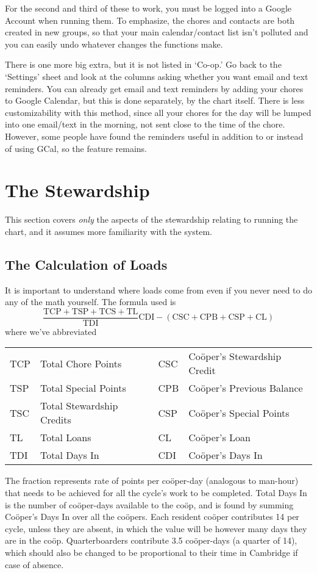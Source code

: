 \documentclass{article}
\begin{document}
For the second and third of these to work, you must be logged into a Google Account when running them.
To emphasize, the chores and contacts are both created in new groups, so that your main calendar/contact list isn't polluted and you can easily undo whatever changes the functions make.

There is one more big extra, but it is not listed in `Co-op.'
Go back to the `Settings' sheet and look at the columns asking whether you want email and text reminders.
You can already get email and text reminders by adding your chores to Google Calendar, but this is done separately, by the chart itself.
There is less customizability with this method, since all your chores for the day will be lumped into one email/text in the morning, not sent close to the time of the chore.
However, some people have found the reminders useful in addition to or instead of using GCal, so the feature remains.

\section{The Stewardship}
This section covers \emph{only} the aspects of the stewardship relating to running the chart, and it assumes more familiarity with the system.

\subsection{The Calculation of Loads}\label{subsec:calculationOfLoads}
It is important to understand where loads come from even if you never need to do any of the math yourself.
The formula used is
\begin{equation*}
\frac{\text{TCP} + \text{TSP} + \text{TCS} + \text{TL}}{\text{TDI}}\text{CDI} - (\text{CSC} + \text{CPB} + \text{CSP} + \text{CL})
\end{equation*}
where we've abbreviated
\begin{center}
\begin{tabular}{llll}
TCP  & Total Chore Points             &
CSC  & Co\"{o}per's Stewardship Credit\\
TSP  & Total Special Points           &
CPB  & Co\"{o}per's Previous Balance\\
TSC  & Total Stewardship Credits      &
CSP  & Co\"{o}per's Special Points\\
TL   & Total Loans                    &
CL   & Co\"{o}per's Loan\\
TDI  & Total Days In                  &
CDI  & Co\"{o}per's Days In
\end{tabular}
\end{center}
The fraction represents rate of points per co\"{o}per-day (analogous to man-hour) that needs to be achieved for all the cycle's work to be completed.
Total Days In is the number of co\"{o}per-days available to the co\"{o}p, and is found by summing Co\"{o}per's Days In over all the co\"{o}pers.
Each resident co\"{o}per contributes 14 per cycle, unless they are absent, in which the value will be however many days they are in the co\"{o}p. 
Quarterboarders contribute 3.5 co\"{o}per-days (a quarter of 14), which should also be changed to be proportional to their time in Cambridge if case of absence.
\end{document}

